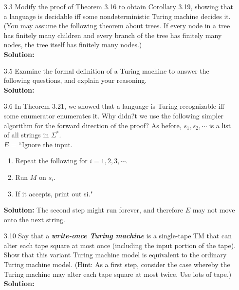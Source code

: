 \begin{enumerate}
\item[3.3]Modify the proof of Theorem 3.16 to obtain Corollary 3.19, showing that a language is decidable iff some nondeterministic Turing machine decides it. (You may assume the following theorem about trees. If every node in a tree has finitely many children and every branch of the tree has finitely many nodes, the tree itself has finitely many nodes.)
\\
\textbf{Solution:} \alreadyanswered

\item[3.5]Examine the formal definition of a Turing machine to answer the following questions, and explain your reasoning.
\\
\textbf{Solution:} \alreadyanswered

\item[3.6]In Theorem 3.21, we showed that a language is Turing-recognizable iff some enumerator enumerates it. Why didn?t we use the following simpler algorithm for the forward direction of the proof? As before, $s_1, s_2, \cdots$ is a list of all strings in $\Sigma^*$.
\\
$E$ = ``Ignore the input.
\begin{enumerate}
\item Repeat the following for $i=1,2,3,\cdots$.
\item Run $M$ on $s_i$.
\item If it accepts, print out si."
\end{enumerate}
\textbf{Solution:} The second step might run forever, and therefore $E$ may not move onto the next string.  

\item[3.10]Say that a \textbf{\emph{write-once Turing machine}} is a single-tape TM that can alter each tape square at most once (including the input portion of the tape). Show that this variant Turing machine model is equivalent to the ordinary Turing machine model. (Hint: As a first step, consider the case whereby the Turing machine may alter each tape square at most twice. Use lots of tape.)
\\
\textbf{Solution:} \alreadyanswered


\end{enumerate}
